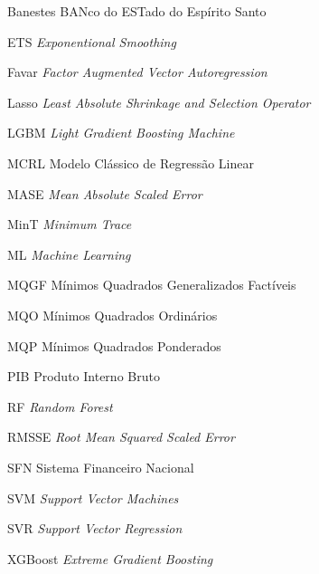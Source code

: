 \listoffigures*
\cleardoublepage


\listoftables*
\cleardoublepage

\begin{siglas}
  \item[Banestes] BANco do ESTado do Espírito Santo
  \item[ETS] \textit{Exponentional Smoothing}
  \item[Favar] \textit{Factor Augmented Vector Autoregression}
  \item[Lasso] \textit{Least Absolute Shrinkage and Selection Operator}
  \item[LGBM] \textit{Light Gradient Boosting Machine}
  \item[MCRL] Modelo Clássico de Regressão Linear
  \item[MASE] \textit{Mean Absolute Scaled Error}
  \item[MinT] \textit{Minimum Trace}
  \item[ML] \textit{Machine Learning}
  \item[MQGF] Mínimos Quadrados Generalizados Factíveis
  \item[MQO] Mínimos Quadrados Ordinários
  \item[MQP] Mínimos Quadrados Ponderados
  \item[PIB] Produto Interno Bruto
  \item[RF] \textit{Random Forest}
  \item[RMSSE] \textit{Root Mean Squared Scaled Error}
  \item[SFN] Sistema Financeiro Nacional
  \item[SVM] \textit{Support Vector Machines}
  \item[SVR] \textit{Support Vector Regression}
  \item[XGBoost] \textit{Extreme Gradient Boosting}
\end{siglas}

